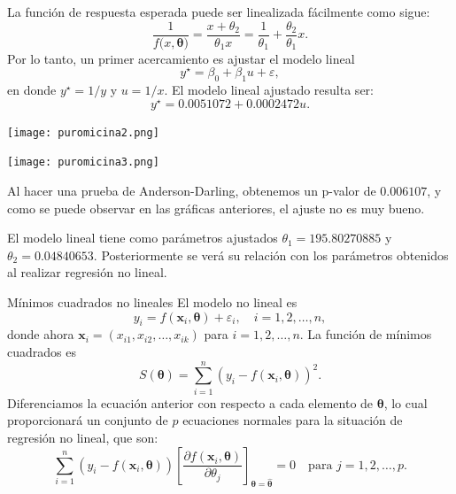 \documentclass[aspectratio = 169, spanish]{beamer}
\begin{document}
\begin{frame}
    La función de respuesta esperada puede ser linealizada fácilmente como sigue:
    \[
    \frac{1}{f(x, \boldsymbol{\theta)}} = \frac{x+\theta_2}{\theta_1 x} = \frac{1}{\theta_1} + \frac{\theta_2}{\theta_1}x.
    \]
    Por lo tanto, un primer acercamiento es ajustar el modelo lineal
    \[
    y^\star = \beta_0 + \beta_1 u + \varepsilon,
    \]
    en donde $y^\star = 1/y$ y $u = 1/x$. El modelo lineal ajustado resulta ser:
    \[
    y^\star = 0.0051072 + 0.0002472 u.
    \]
\end{frame}

\begin{frame}
    \begin{center}
        \texttt{[image: puromicina2.png]}
    \end{center}
\end{frame}

\begin{frame}
    \begin{center}
        \texttt{[image: puromicina3.png]}
    \end{center}    
\end{frame}

\begin{frame}
    Al hacer una prueba de Anderson-Darling, obtenemos un p-valor de $0.006107$, y como se puede observar en las gráficas anteriores, el ajuste no es muy bueno.
    
    El modelo lineal tiene como parámetros ajustados $\theta_1 = 195.80270885$ y $\theta_2 = 0.04840653$. Posteriormente se verá su relación con los parámetros obtenidos al realizar regresión no lineal.
\end{frame}

\begin{frame}{Mínimos cuadrados no lineales}
El modelo no lineal es
\[
y_{i} = f\left( \bm{x}_{i}, \bm{\theta} \right) + \varepsilon_{i}, \quad i=1,2,\ldots,n,
\]
donde ahora $\bm{x}_{i} = (x_{i1}, x_{i2}, \ldots, x_{ik})$ para $i=1,2,\ldots,n$. La función de mínimos cuadrados es
\[
S(\bm{\theta}) = \sum_{i=1}^{n} \left( y_{i} - f\left( \bm{x}_{i}, \bm{\theta} \right) \right)^{2}.
\]
Diferenciamos la ecuación anterior con respecto a cada elemento de $\bm{\theta}$, lo cual proporcionará un conjunto de $p$ ecuaciones normales para la situación de regresión no lineal, que son:
\[
\sum_{i=1}^{n} \left( y_{i} - f\left( \bm{x}_{i}, \bm{\theta} \right) \right) {\left[ \frac{\partial f\left( \bm{x}_{i}, \bm{\theta} \right)}{\partial \theta_{j}} \right]}_{\bm{\theta} = \hat{\bm{\theta}}} = 0 \quad \text{para } j=1,2,\ldots,p.
\]
\end{frame}
\end{document}
